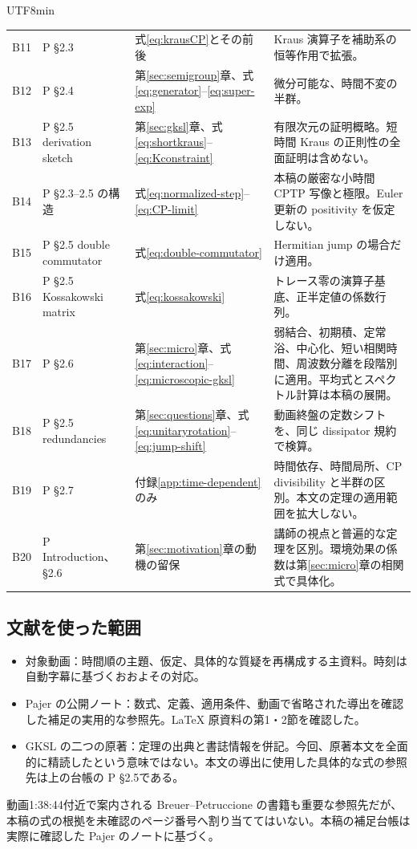\documentclass[11pt,a4paper]{article}
\numberwithin{equation}{section}
\begin{document}
\begin{CJK*}{UTF8}{min}
\begin{longtable}{p{}p{}p{}p{}}
B11 & P §2.3 & 式\eqref{eq:krausCP}とその前後 & Kraus 演算子を補助系の恒等作用で拡張。\\
B12 & P §2.4 & 第\ref{sec:semigroup}章、式\eqref{eq:generator}--\eqref{eq:super-exp} & 微分可能な、時間不変の半群。\\
B13 & P §2.5 derivation sketch & 第\ref{sec:gksl}章、式\eqref{eq:shortkraus}--\eqref{eq:Kconstraint} & 有限次元の証明概略。短時間 Kraus の正則性の全面証明は含めない。\\
B14 & P §2.3--2.5 の構造 & 式\eqref{eq:normalized-step}--\eqref{eq:CP-limit} & 本稿の厳密な小時間 CPTP 写像と極限。Euler 更新の positivity を仮定しない。\\
B15 & P §2.5 double commutator & 式\eqref{eq:double-commutator} & Hermitian jump の場合だけ適用。\\
B16 & P §2.5 Kossakowski matrix & 式\eqref{eq:kossakowski} & トレース零の演算子基底、正半定値の係数行列。\\
B17 & P §2.6 & 第\ref{sec:micro}章、式\eqref{eq:interaction}--\eqref{eq:microscopic-gksl} & 弱結合、初期積、定常浴、中心化、短い相関時間、周波数分離を段階別に適用。平均式とスペクトル計算は本稿の展開。\\
B18 & P §2.5 redundancies & 第\ref{sec:questions}章、式\eqref{eq:unitaryrotation}--\eqref{eq:jump-shift} & 動画終盤の定数シフトを、同じ dissipator 規約で検算。\\
B19 & P §2.7 & 付録\ref{app:time-dependent}のみ & 時間依存、時間局所、CP divisibility と半群の区別。本文の定理の適用範囲を拡大しない。\\
B20 & P Introduction、§2.6 & 第\ref{sec:motivation}章の動機の留保 & 講師の視点と普遍的な定理を区別。環境効果の係数は第\ref{sec:micro}章の相関式で具体化。\\\bottomrule
\end{longtable}

\subsection*{文献を使った範囲}
\begin{itemize}
\item 対象動画\cite{video}：時間順の主題、仮定、具体的な質疑を再構成する主資料。時刻は自動字幕に基づくおおよその対応。
\item Pajer の公開ノート\cite{pajer}：数式、定義、適用条件、動画で省略された導出を確認した補足の実用的な参照先。LaTeX 原資料の第1・2節を確認した。
\item GKSL の二つの原著\cite{gks,lindblad}：定理の出典と書誌情報を併記。今回、原著本文を全面的に精読したという意味ではない。本文の導出に使用した具体的な式の参照先は上の台帳の P §2.5である。
\end{itemize}
動画1:38:44付近で案内される Breuer--Petruccione の書籍も重要な参照先だが、本稿の式の根拠を未確認のページ番号へ割り当ててはいない。本稿の補足台帳は実際に確認した Pajer のノートに基づく。


\end{CJK*}
\end{document}
